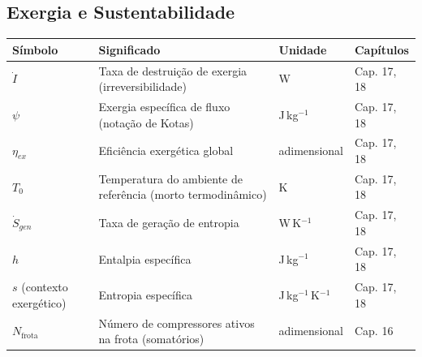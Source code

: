 \documentclass[12pt,a4paper]{article}
\numberwithin{equation}{section}
\numberwithin{table}{section}
\numberwithin{figure}{section}
\begin{document}
{\subsection*{Exergia e Sustentabilidade}
\begin{longtable}{>{\raggedright\arraybackslash}p{2.8cm} >{\raggedright\arraybackslash}p{5.3cm} >{\raggedright\arraybackslash}p{2.1cm} >{\raggedright\arraybackslash}p{4.2cm}}
	\toprule
	\textbf{Símbolo} & \textbf{Significado} & \textbf{Unidade} & \textbf{Capítulos} \\ \midrule
	\endhead
	$\dot{I}$ & Taxa de destruição de exergia (irreversibilidade) & W & Cap. 17, 18 \\
	$\psi$\dag & Exergia específica de fluxo (notação de Kotas) & J\,kg$^{-1}$ & Cap. 17, 18 \\
	$\eta_{ex}$ & Eficiência exergética global & adimensional & Cap. 17, 18 \\
	$T_0$ & Temperatura do ambiente de referência (morto termodinâmico) & K & Cap. 17, 18 \\
	$\dot{S}_{gen}$ & Taxa de geração de entropia & W\,K$^{-1}$ & Cap. 17, 18 \\
	$h$ & Entalpia específica & J\,kg$^{-1}$ & Cap. 17, 18 \\
	$s$ (contexto exergético) & Entropia específica & J\,kg$^{-1}$\,K$^{-1}$ & Cap. 17, 18 \\
	$N_{\text{frota}}$\dag & Número de compressores ativos na frota (somatórios) & adimensional & Cap. 16 \\ \bottomrule
\end{longtable}

}
\end{document}
